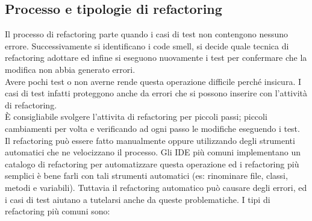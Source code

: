 \subsection{Processo e tipologie di refactoring}
Il processo di refactoring parte quando i casi di test non contengono nessuno errore.
Successivamente si identificano i code smell, si decide quale tecnica di refactoring adottare ed infine si eseguono nuovamente i test per confermare che la modifica non abbia generato errori.\\
Avere pochi test o non averne rende questa operazione difficile perché insicura.
I casi di test infatti proteggono anche da errori che si possono inserire con l'attività di refactoring.\\
È consigliabile svolgere l'attivita di refactoring per piccoli passi; piccoli cambiamenti per volta e verificando ad ogni passo le modifiche eseguendo i test.\\
Il refactoring può essere fatto manualmente oppure utilizzando degli strumenti automatici che ne velocizzano il processo.
Gli \acrfull{IDE} più comuni implementano un catalogo di refactoring per automatizzare questa operazione ed i refactoring più semplici è bene farli con tali strumenti automatici (es: rinominare file, classi, metodi e variabili).
Tuttavia il refactoring automatico può causare degli errori, ed i casi di test aiutano a tutelarsi anche da queste problematiche.
I tipi di refactoring più comuni sono:
